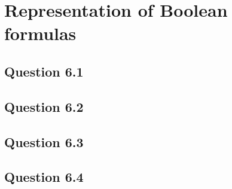\section{Representation of Boolean formulas}
\subsection*{Question 6.1}
\subsection*{Question 6.2}
\subsection*{Question 6.3}
\subsection*{Question 6.4}